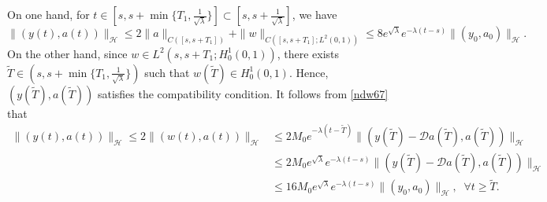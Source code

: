 \documentclass[a4paper]{article}
\numberwithin{equation}{section}
\begin{document}
On one hand, for $t\in [s,s+\min\{{T}_1,\frac{1}{\sqrt{\lambda}}\}]\subset[s,s+\frac{1}{\sqrt{\lambda}}]$, we have
\begin{equation}\label{M167}
\|(y(t),a(t))\|_{\mathcal{H}}\le 2\|a\|_{C([s,s+{T}_1])}+\|w\|_{C([s,s+{T}_1];L^2(0,1))} \le 8e^{\sqrt{\lambda } }e^{-\lambda  (t-s)}\|(y_0,a_0)\|_{\mathcal{H}}.
\end{equation}
On the other hand, since $w\in L^2(s,s+{T}_1;H^1_0(0,1))$, there exists $\tilde{T}\in (s,s+\min\{{T}_1,\frac{1}{\sqrt{\lambda}}\})$ such that $w(\tilde{T})\in H_0^1(0,1)$. Hence, $(y(\tilde{T}),a(\tilde{T}))$ satisfies the compatibility condition. It follows from \eqref{ndw67} that
\begin{equation}\label{M267}\begin{aligned}\|(y(t),a(t))\|_{\mathcal{H}}\le 2\|(w(t),a(t))\|_{\mathcal{H}}&\le 2M_0e^{-\lambda (t-\tilde{T})}\|(y(\tilde{T})-\mathcal{D}a(  \tilde{T}),a (  \tilde{T}))\|_{\mathcal{H}}\\
&\le 2M_0e^{\sqrt{\lambda } }e^{-\lambda (t-s)}\|(y(\tilde{T})-\mathcal{D}a(  \tilde{T}),a (  \tilde{T}))\|_{\mathcal{H}}\\
&\le 16M_0e^{\sqrt{\lambda } }e^{-\lambda (t-s)}\|(y_0,a_0)\|_{\mathcal{H}},\;\;\forall t\ge \tilde{T}.\end{aligned}\end{equation}
\end{document}
